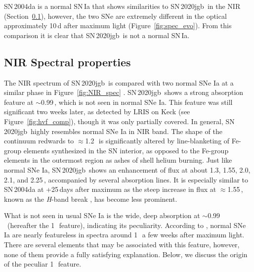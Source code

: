 \documentclass[twocolumn]{aastex631}
\newcommand{\sn}{SN\,2020jgb}
\begin{document}
SN\,2004da is a normal SN\,Ia that shows similarities to \sn\ in the NIR (Section~\ref{sec:NIR_spec}), however, the two SNe are extremely different in the optical approximately 10\,d after maximum light (Figure~\ref{fig:spec_evo}). From this comparison it is clear that \sn\ is not a normal SN\,Ia. 

\subsection{NIR Spectral properties}
\label{sec:NIR_spec}
The NIR spectrum of \sn\ is compared with two normal SNe Ia at a similar phase in Figure~\ref{fig:NIR_spec} \citep[data for SNe\,2004ab and 2004da from][]{Marion2009_NIR}. \sn\ shows a strong absorption feature at $\sim$0.99\,\micron, which is not seen in normal SNe Ia. This feature was still significant two weeks later, as detected by LRIS on Keck (see Figure~\ref{fig:hvf_comp}), though it was only partially covered. In general, \sn\ highly resembles normal SNe Ia in NIR band. The shape of the continuum redwards to $\approx$1.2\,\micron\ is significantly altered by line-blanketing of Fe-group elements synthesized in the SN interior, as opposed to the Fe-group elements in the outermost region as ashes of shell helium burning. Just like normal SNe Ia, \sn\ shows an enhancement of flux at about 1.3, 1.55, 2.0, 2.1, and 2.25\,\micron, accompanied by several  absorption lines. It is especially similar to SN\,2004da at +25\,days after maximum as the steep increase in flux at $\approx$1.55\,\micron, known as the \textit H-band break \citep{hsiao_CSP_2019}, has become less prominent.%

What is not seen in usual SNe Ia is the wide, deep absorption at $\sim$0.99\,\micron\ (hereafter the 1\,\micron\ feature), indicating its peculiarity. According to \citet{Marion2009_NIR}, normal SNe Ia are nearly featureless in spectra around 1\,\micron\ a few weeks after maximum light. There are several elements that may be associated with this feature, however, none of them provide a fully satisfying explanation. Below, we discuss the origin of the peculiar 1\,\micron\ feature.
\end{document}
